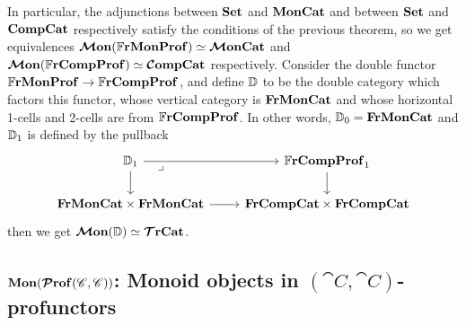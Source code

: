 \documentclass[12pt,oneside,article,draft]{memoir}
\begin{document}
In particular, the adjunctions between $\mathbf{Set}$ and $\mathbf{MonCat}$ and between $\mathbf{Set}$ and $\mathbf{CompCat}$ respectively satisfy the conditions of the previous theorem, so we get equivalences $\bm{\mathcal{M}}\mathbf{on}(\mathbb{F}\mathbf{rMonProf})\simeq\bm{\mathcal{M}}\mathbf{onCat}$ and $\bm{\mathcal{M}}\mathbf{on}(\mathbb{F}\mathbf{rCompProf})\simeq\bm{\mathcal{C}}\mathbf{ompCat}$ respectively.
Consider the double functor $\mathbb{F}\mathbf{rMonProf}\to\mathbb{F}\mathbf{rCompProf}$, and define $\mathbb{D}$ to be the double category which factors this functor, whose vertical category is $\mathbf{FrMonCat}$ and whose horizontal 1-cells and 2-cells are from $\mathbb{F}\mathbf{rCompProf}$.
In other words, $\mathbb{D}_0=\mathbf{FrMonCat}$ and $\mathbb{D}_1$ is defined by the pullback
\[
   \begin{tikzcd}
      \dcat{D}_1 \ar[r] \ar[d] \ar[dr,phantom,"\lrcorner"very near start]
      & \dFrCompProf_1 \ar[d]
      \\
      \FrMonCat\times\FrMonCat \ar[r]
      & \FrCompCat\times\FrCompCat
   \end{tikzcd}
\]
then we get $\bm{\mathcal{M}}\mathbf{on}(\mathbb{D})\simeq\bm{\mathcal{T}}\mathbf{rCat}$.

\subsection{$\mathbf{Mon}(\bm{\mathcal{P}}\mathbf{rof}(\mathscr{C},\mathscr{C}))$: Monoid objects in $(\cat{C},\cat{C})$-profunctors}

%

\end{document}
